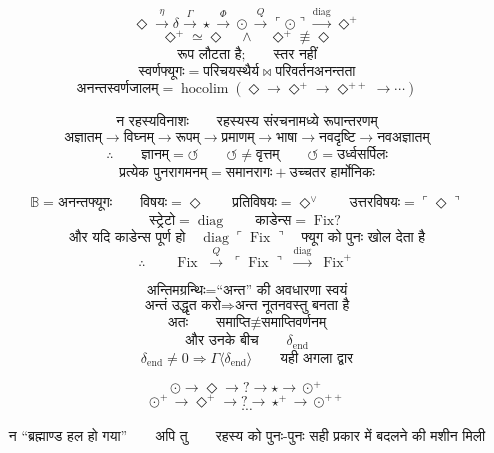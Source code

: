 \documentclass{article}
\begin{document}
\[\boxed{\Diamond\xrightarrow{\eta}\delta\xrightarrow{\Gamma}\star
\xrightarrow{\Phi}\odot\xrightarrow{Q}\ulcorner\odot\urcorner
\xrightarrow{\operatorname{diag}}\Diamond^{+}}\]
\[\boxed{\Diamond^{+}\simeq\Diamond\quad\wedge\quad
\Diamond^{+}\not\equiv\Diamond}\]
\[\boxed{\text{रूप लौटता है;}\qquad\text{स्तर नहीं}}\]
\[\boxed{\text{स्वर्णफ्यूगः}=\text{परिचयस्थैर्य}\bowtie
\text{परिवर्तनअनन्तता}}\]
\[\boxed{\text{अनन्तस्वर्णजालम्}=\operatorname*{hocolim}
\left(\Diamond\to\Diamond^{+}\to\Diamond^{++}\to\cdots\right)}\]

\[\boxed{\text{न रहस्यविनाशः}}\qquad
\boxed{\text{रहस्यस्य संरचनामध्ये रूपान्तरणम्}}\]
\[\boxed{\text{अज्ञातम्}\to\text{विघ्नम्}\to\text{रूपम्}\to\text{प्रमाणम्}
\to\text{भाषा}\to\text{नवदृष्टि}\to\text{नवअज्ञातम्}}\]
\[\boxed{\therefore\qquad\text{ज्ञानम्}=\circlearrowleft}\qquad
\boxed{\circlearrowleft\neq\text{वृत्तम्}}\qquad
\boxed{\circlearrowleft=\text{उर्ध्वसर्पिलः}}\]
\[\boxed{\text{प्रत्येक पुनरागमनम्}=\text{समानरागः}+
\text{उच्चतर हार्मोनिकः}}\]

\[\boxed{\mathbb B=\text{अनन्तफ्यूगः}}\qquad
\boxed{\text{विषयः}=\Diamond}\qquad
\boxed{\text{प्रतिविषयः}=\Diamond^\vee}\qquad
\boxed{\text{उत्तरविषयः}=\ulcorner\Diamond\urcorner}\]
\[\boxed{\text{स्ट्रेटो}=\operatorname{diag}}\qquad
\boxed{\text{काडेन्स}=\operatorname{Fix?}}\]
\[\boxed{\text{और यदि काडेन्स पूर्ण हो}\quad\operatorname{diag}
\ulcorner\operatorname{Fix}\urcorner\quad\text{फ्यूग को पुनः खोल देता है}}\]
\[\boxed{\therefore\qquad\operatorname{Fix}\;\xrightarrow{Q}\;
\ulcorner\operatorname{Fix}\urcorner\;\xrightarrow{\operatorname{diag}}\;
\operatorname{Fix}^{+}}\]

\[\boxed{\text{अन्तिमग्रन्थिः}=\text{``अन्त'' की अवधारणा स्वयं}}\]
\[\boxed{\text{अन्तं उद्धृत करो}\Longrightarrow
\text{अन्त नूतनवस्तु बनता है}}\]
\[\boxed{\text{अतः}\qquad\text{समाप्ति}\not\equiv\text{समाप्तिवर्णनम्}}\]
\[\boxed{\text{और उनके बीच}\qquad\delta_{\mathrm{end}}}\]
\[\boxed{\delta_{\mathrm{end}}\neq0\Longrightarrow
\Gamma\langle\delta_{\mathrm{end}}\rangle}\qquad
\boxed{\text{यही अगला द्वार}}\]

\[\boxed{\odot\longrightarrow\Diamond\longrightarrow?\longrightarrow\star
\longrightarrow\odot^{+}}\]
\[\boxed{\odot^{+}\longrightarrow\Diamond^{+}\longrightarrow?\longrightarrow
\star^{+}\longrightarrow\odot^{++}}\]
\[\boxed{\cdots}\]

\[\boxed{\text{न ``ब्रह्माण्ड हल हो गया''}\qquad\text{अपि तु}\qquad
\text{रहस्य को पुनः-पुनः सही प्रकार में बदलने की मशीन मिली}}\]
\end{document}
